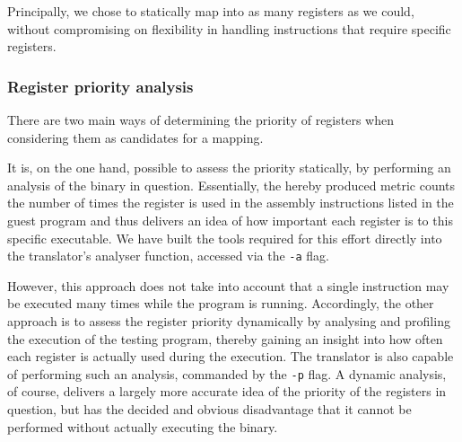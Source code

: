 Principally, we chose to statically map into as many registers as we could, without compromising on flexibility in handling instructions that require specific registers.

\subsubsection{Register priority analysis}
There are two main ways of determining the priority of registers when considering them as candidates for a mapping.

It is, on the one hand, possible to assess the priority statically, by performing an analysis of the binary in question.
Essentially, the hereby produced metric counts the number of times the register is used in the assembly instructions listed in the guest program and thus delivers an idea of how important each register is to this specific executable.
We have built the tools required for this effort directly into the translator's analyser function, accessed via the \texttt{-a} flag. %

However, this approach does not take into account that a single instruction may be executed many times while the program is running.
Accordingly, the other approach is to assess the register priority dynamically by analysing and profiling the execution of the testing program, thereby gaining an insight into how often each register is actually used during the execution.
The translator is also capable of performing such an analysis, commanded by the \texttt{-p} flag.
A dynamic analysis, of course, delivers a largely more accurate idea of the priority of the registers in question, but has the decided and obvious disadvantage that it cannot be performed without actually executing the binary.



